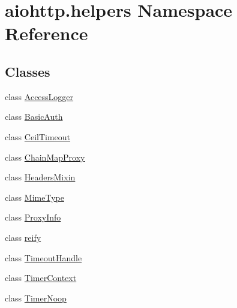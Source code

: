 \hypertarget{namespaceaiohttp_1_1helpers}{}\section{aiohttp.\+helpers Namespace Reference}
\label{namespaceaiohttp_1_1helpers}
\subsection*{Classes}
\begin{DoxyCompactItemize}
\item 
class \hyperlink{classaiohttp_1_1helpers_1_1_access_logger}{Access\+Logger}
\item 
class \hyperlink{classaiohttp_1_1helpers_1_1_basic_auth}{Basic\+Auth}
\item 
class \hyperlink{classaiohttp_1_1helpers_1_1_ceil_timeout}{Ceil\+Timeout}
\item 
class \hyperlink{classaiohttp_1_1helpers_1_1_chain_map_proxy}{Chain\+Map\+Proxy}
\item 
class \hyperlink{classaiohttp_1_1helpers_1_1_headers_mixin}{Headers\+Mixin}
\item 
class \hyperlink{classaiohttp_1_1helpers_1_1_mime_type}{Mime\+Type}
\item 
class \hyperlink{classaiohttp_1_1helpers_1_1_proxy_info}{Proxy\+Info}
\item 
class \hyperlink{classaiohttp_1_1helpers_1_1reify}{reify}
\item 
class \hyperlink{classaiohttp_1_1helpers_1_1_timeout_handle}{Timeout\+Handle}
\item 
class \hyperlink{classaiohttp_1_1helpers_1_1_timer_context}{Timer\+Context}
\item 
class \hyperlink{classaiohttp_1_1helpers_1_1_timer_noop}{Timer\+Noop}
\end{DoxyCompactItemize}
